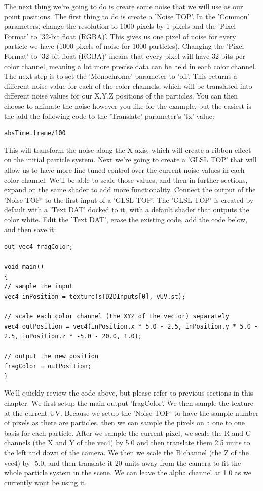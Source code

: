 \begin{fullwidth}
The next thing we're going to do is create some noise that we will use as our point positions. The first thing to do is create a 'Noise TOP'. In the 'Common' parameters, change the resolution to 1000 pixels by 1 pixels and the 'Pixel Format' to '32-bit float (RGBA)'. This gives us one pixel of noise for every particle we have (1000 pixels of noise for 1000 particles). Changing the 'Pixel Format' to '32-bit float (RGBA)' means that every pixel will have 32-bits per color channel, meaning a lot more precise data can be held in each color channel. The next step is to set the 'Monochrome' parameter to 'off'. This returns a different noise value for each of the color channels, which will be translated into different noise values for our X,Y,Z positions of the particles. You can then choose to animate the noise however you like for the example, but the easiest is the add the following code to the 'Translate' parameter's 'tx' value:

\begin{lstlisting}
absTime.frame/100
\end{lstlisting}

This will transform the noise along the X axis, which will create a ribbon-effect on the initial particle system. Next we're going to create a 'GLSL TOP' that will allow us to have more fine tuned control over the current noise values in each color channel. We'll be able to scale those values, and then in further sections, expand on the same shader to add more functionality. Connect the output of the 'Noise TOP' to the first input of a 'GLSL TOP'. The 'GLSL TOP' is created by default with a 'Text DAT' docked to it, with a default shader that outputs the color white. Edit the 'Text DAT', erase the existing code, add the code below, and then save it:

\begin{lstlisting}
out vec4 fragColor;

void main()
{
// sample the input
vec4 inPosition = texture(sTD2DInputs[0], vUV.st);

// scale each color channel (the XYZ of the vector) separately
vec4 outPosition = vec4(inPosition.x * 5.0 - 2.5, inPosition.y * 5.0 - 2.5, inPosition.z * -5.0 - 20.0, 1.0);

// output the new position
fragColor = outPosition;
}
\end{lstlisting}

We'll quickly review the code above, but please refer to previous sections in this chapter. We first setup the main output 'fragColor'. We then sample the texture at the current UV. Because we setup the 'Noise TOP' to have the sample number of pixels as there are particles, then we can sample the pixels on a one to one basis for each particle. After we sample the current pixel, we scale the R and G channels (the X and Y of the vec4) by 5.0 and then translate them 2.5 units to the left and down of the camera. We then we scale the B channel (the Z of the vec4) by -5.0, and then translate it 20 units away from the camera to fit the whole particle system in the scene. We can leave the alpha channel at 1.0 as we currently wont be using it.


\end{fullwidth}

